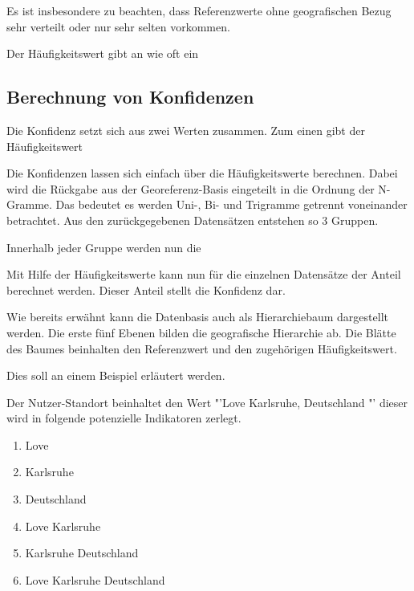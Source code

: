 			Es ist insbesondere zu beachten, dass Referenzwerte ohne geografischen Bezug sehr verteilt oder nur sehr selten vorkommen. 


			Der Häufigkeitswert gibt an wie oft ein  



		









		\subsection{Berechnung von Konfidenzen}

			Die Konfidenz setzt sich aus zwei Werten zusammen. 
			Zum einen gibt der Häufigkeitswert

			Die Konfidenzen lassen sich einfach über die Häufigkeitswerte berechnen. 
			Dabei wird die Rückgabe aus der Georeferenz-Basis eingeteilt in die Ordnung der N-Gramme. 
			Das bedeutet es werden Uni-, Bi- und Trigramme getrennt voneinander betrachtet.
			Aus den zurückgegebenen Datensätzen entstehen so 3 Gruppen.

			Innerhalb jeder Gruppe werden nun die 

			Mit Hilfe der Häufigkeitswerte kann nun für die einzelnen Datensätze der Anteil berechnet werden. 
			Dieser Anteil stellt die Konfidenz dar. 

			Wie bereits erwähnt kann die Datenbasis auch als Hierarchiebaum dargestellt werden. 
			Die erste fünf Ebenen bilden die geografische Hierarchie ab. 
			Die Blätte des Baumes beinhalten den Referenzwert und den zugehörigen Häufigkeitswert.


		Dies soll an einem Beispiel erläutert werden.

		Der Nutzer-Standort beinhaltet den Wert "'Love Karlsruhe, Deutschland "' dieser wird in folgende potenzielle Indikatoren zerlegt.

		\begin{multicols}{2}
			\begin{enumerate}
			   		\item Love
			   		\item Karlsruhe
			   		\item Deutschland
			   		\item Love Karlsruhe
			   		\item Karlsruhe Deutschland
			   		\item Love Karlsruhe Deutschland
			\end{enumerate}   	
		\end{multicols}


